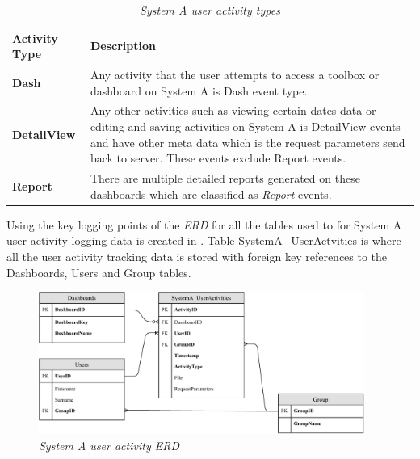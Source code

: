 \begin{table}[!htb]
	\centering
	\small
	\caption[System A user activity types]
	{\textit{System A user activity types}}
	\label{tbl:Ch2_SystemA_EventTypes}
	\begin{tabularx}{\textwidth}{|l|X|}
		\hline \textbf{Activity Type} & \textbf{Description} \\
		\hline \textbf{Dash} & Any activity that the user attempts to access a toolbox or dashboard on System A is Dash event type. \\
		\hline \textbf{DetailView} & Any other activities such as viewing certain dates data or editing and saving activities on System A is DetailView events and have other meta data which is the request parameters send back to server. These events exclude Report events. \\
		\hline \textbf{Report} & There are multiple detailed reports generated on these dashboards which are classified as \emph{Report} events. \\
		\hline
	\end{tabularx}
\end{table}

Using the key logging points of  the \emph{ERD} for all the tables used to for System A user activity logging data is created in . Table SystemA\_UserActvities is where all the user activity tracking data is stored with foreign key references to the Dashboards, Users and Group tables.

\begin{figure}[!htb] %
	\centering %
	\includegraphics[width=0.95\textwidth]{Images/Chapter2/SystemA_ERD_Basic/SystemA_ERD_Basic.pdf}
	\caption[System A user activity ERD]
	{\textit{System A user activity ERD}}\label{fig:Ch2_SystemA_Basic_ERD}
\end{figure}

\clearpage


